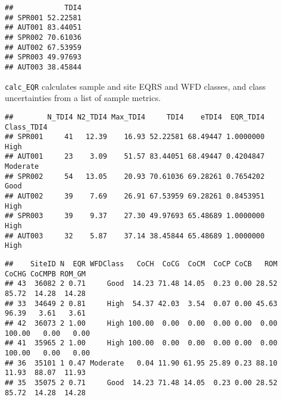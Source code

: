 \documentclass[]{article}
\newenvironment{Shaded}{\begin{snugshade}}{\end{snugshade}}
\newcommand{\KeywordTok}[1]{\textcolor[rgb]{0.13,0.29,0.53}{\textbf{#1}}}
\newcommand{\DataTypeTok}[1]{\textcolor[rgb]{0.13,0.29,0.53}{#1}}
\newcommand{\DecValTok}[1]{\textcolor[rgb]{0.00,0.00,0.81}{#1}}
\newcommand{\StringTok}[1]{\textcolor[rgb]{0.31,0.60,0.02}{#1}}
\newcommand{\OperatorTok}[1]{\textcolor[rgb]{0.81,0.36,0.00}{\textbf{#1}}}
\newcommand{\NormalTok}[1]{#1}
\begin{document}
\begin{verbatim}
##            TDI4
## SPR001 52.22581
## AUT001 83.44051
## SPR002 70.61036
## AUT002 67.53959
## SPR003 49.97693
## AUT003 38.45844
\end{verbatim}

\texttt{calc\_EQR} calculates sample and site EQRS and WFD classes, and
class uncertainties from a list of sample metrics.

\begin{Shaded}
\end{Shaded}

\begin{verbatim}
##        N_TDI4 N2_TDI4 Max_TDI4     TDI4    eTDI4  EQR_TDI4 Class_TDI4
## SPR001     41   12.39    16.93 52.22581 68.49447 1.0000000       High
## AUT001     23    3.09    51.57 83.44051 68.49447 0.4204847   Moderate
## SPR002     54   13.05    20.93 70.61036 69.28261 0.7654202       Good
## AUT002     39    7.69    26.91 67.53959 69.28261 0.8453951       High
## SPR003     39    9.37    27.30 49.97693 65.48689 1.0000000       High
## AUT003     32    5.87    37.14 38.45844 65.48689 1.0000000       High
\end{verbatim}

\begin{Shaded}
\end{Shaded}

\begin{verbatim}
##    SiteID N  EQR WFDClass   CoCH  CoCG  CoCM  CoCP CoCB   ROM  CoCHG CoCMPB ROM_GM
## 43  36082 2 0.71     Good  14.23 71.48 14.05  0.23 0.00 28.52  85.72  14.28  14.28
## 33  34649 2 0.81     High  54.37 42.03  3.54  0.07 0.00 45.63  96.39   3.61   3.61
## 42  36073 2 1.00     High 100.00  0.00  0.00  0.00 0.00  0.00 100.00   0.00   0.00
## 41  35965 2 1.00     High 100.00  0.00  0.00  0.00 0.00  0.00 100.00   0.00   0.00
## 36  35101 1 0.47 Moderate   0.04 11.90 61.95 25.89 0.23 88.10  11.93  88.07  11.93
## 35  35075 2 0.71     Good  14.23 71.48 14.05  0.23 0.00 28.52  85.72  14.28  14.28
\end{verbatim}
\end{document}
